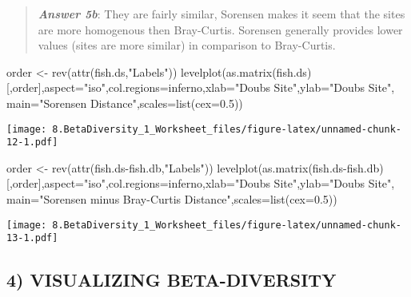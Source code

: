 \documentclass[
]{article}
\newenvironment{Shaded}{\begin{snugshade}}{\end{snugshade}}
\newcommand{\AttributeTok}[1]{\textcolor[rgb]{0.77,0.63,0.00}{#1}}
\newcommand{\FloatTok}[1]{\textcolor[rgb]{0.00,0.00,0.81}{#1}}
\newcommand{\FunctionTok}[1]{\textcolor[rgb]{0.00,0.00,0.00}{#1}}
\newcommand{\NormalTok}[1]{#1}
\newcommand{\OtherTok}[1]{\textcolor[rgb]{0.56,0.35,0.01}{#1}}
\newcommand{\SpecialCharTok}[1]{\textcolor[rgb]{0.00,0.00,0.00}{#1}}
\newcommand{\StringTok}[1]{\textcolor[rgb]{0.31,0.60,0.02}{#1}}
\begin{document}
\begin{quote}
\textbf{\emph{Answer 5b}}: They are fairly similar, Sorensen makes it
seem that the sites are more homogenous then Bray-Curtis. Sorensen
generally provides lower values (sites are more similar) in comparison
to Bray-Curtis.
\end{quote}

\begin{Shaded}
\begin{Highlighting}[]
\NormalTok{order }\OtherTok{\textless{}{-}} \FunctionTok{rev}\NormalTok{(}\FunctionTok{attr}\NormalTok{(fish.ds,}\StringTok{"Labels"}\NormalTok{))}
\FunctionTok{levelplot}\NormalTok{(}\FunctionTok{as.matrix}\NormalTok{(fish.ds)[,order],}\AttributeTok{aspect=}\StringTok{"iso"}\NormalTok{,}\AttributeTok{col.regions=}\NormalTok{inferno,}\AttributeTok{xlab=}\StringTok{"Doubs Site"}\NormalTok{,}\AttributeTok{ylab=}\StringTok{"Doubs Site"}\NormalTok{, }\AttributeTok{main=}\StringTok{"Sorensen Distance"}\NormalTok{,}\AttributeTok{scales=}\FunctionTok{list}\NormalTok{(}\AttributeTok{cex=}\FloatTok{0.5}\NormalTok{))}
\end{Highlighting}
\end{Shaded}

\texttt{[image: 8.BetaDiversity\_1\_Worksheet\_files/figure-latex/unnamed-chunk-12-1.pdf]}

\begin{Shaded}
\begin{Highlighting}[]
\NormalTok{order }\OtherTok{\textless{}{-}} \FunctionTok{rev}\NormalTok{(}\FunctionTok{attr}\NormalTok{(fish.ds}\SpecialCharTok{{-}}\NormalTok{fish.db,}\StringTok{"Labels"}\NormalTok{))}
\FunctionTok{levelplot}\NormalTok{(}\FunctionTok{as.matrix}\NormalTok{(fish.ds}\SpecialCharTok{{-}}\NormalTok{fish.db)[,order],}\AttributeTok{aspect=}\StringTok{"iso"}\NormalTok{,}\AttributeTok{col.regions=}\NormalTok{inferno,}\AttributeTok{xlab=}\StringTok{"Doubs Site"}\NormalTok{,}\AttributeTok{ylab=}\StringTok{"Doubs Site"}\NormalTok{, }\AttributeTok{main=}\StringTok{"Sorensen minus Bray{-}Curtis Distance"}\NormalTok{,}\AttributeTok{scales=}\FunctionTok{list}\NormalTok{(}\AttributeTok{cex=}\FloatTok{0.5}\NormalTok{))}
\end{Highlighting}
\end{Shaded}

\texttt{[image: 8.BetaDiversity\_1\_Worksheet\_files/figure-latex/unnamed-chunk-13-1.pdf]}

\hypertarget{visualizing-beta-diversity}{%
\subsection{4) VISUALIZING
BETA-DIVERSITY}\label{visualizing-beta-diversity}}
\end{document}
